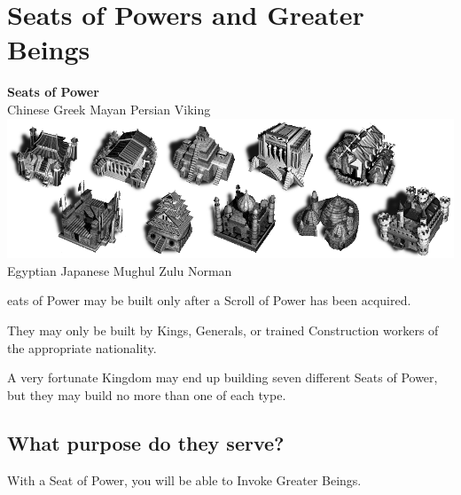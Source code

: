 
\chapter{Seats of Powers and Greater Beings}


\begin{center}
	\textbf{Seats of Power}
	\\ Chinese Greek Mayan Persian Viking
	\includegraphics[width=0.7\linewidth]{Iseats}
	\\ Egyptian Japanese Mughul Zulu Norman
\end{center}

eats of Power may be built only after a Scroll of Power has been acquired.

They may only be built by Kings, Generals, or trained Construction workers of the appropriate nationality.

A very fortunate Kingdom may end up building seven different Seats of Power, but they may build no more than one of each type.

\clearpage

\section{What purpose do they serve?}

With a Seat of Power, you will be able to Invoke Greater Beings.

